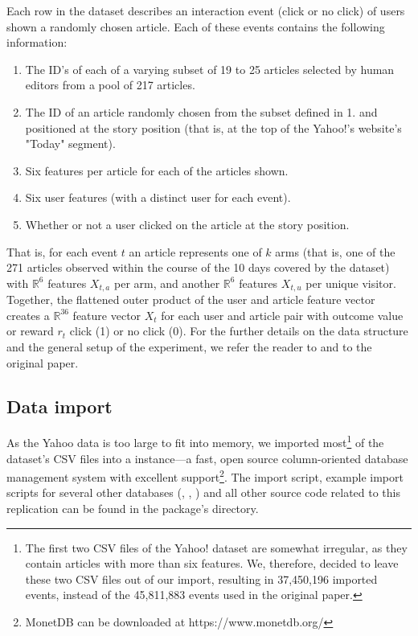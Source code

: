 \documentclass{jss}
\begin{document}
Each row in the dataset describes an interaction event (click or no click) of users shown a randomly chosen article. Each of these events contains the following information:

\begin{enumerate}
         \item The ID's of each of a varying subset of 19 to 25 articles selected by human editors from a pool of 217 articles.
         \item The ID of an article randomly chosen from the subset defined in 1. and positioned at the story position (that is, at the top of the Yahoo!'s website's "Today" segment).
         \item Six features per article for each of the articles shown.
         \item Six user features (with a distinct user for each event).
         \item Whether or not a user clicked on the article at the story position.
\end{enumerate}

That is, for each event $t$ an article represents one of $k$ arms (that is, one of the 271 articles observed within the course of the 10 days covered by the dataset) with $\mathbb{R}^6$ features $X_{t,a}$ per arm, and another $\mathbb{R}^6$ features $X_{t,u}$ per unique visitor. Together, the flattened outer product of the user and article feature vector creates a $\mathbb{R}^{36}$ feature vector $X_t$ for each user and article pair with outcome value or reward $r_t$ click (1) or no click (0). For the further details on the data structure and the general setup of the experiment, we refer the reader to \cite{Chu2009} and to the original \cite{Li2010} paper.

\subsection{Data import} \label{dataimp}

As the Yahoo data is too large to fit into memory, we imported most\footnote{The first two CSV files of the Yahoo! dataset are somewhat irregular, as they contain articles with more than six features. We, therefore, decided to leave these two CSV files out of our import, resulting in 37,450,196 imported events, instead of the 45,811,883 events used in the original paper.} of the dataset's CSV files into a  \citep{IdreosGNMMK12} instance---a fast, open source column-oriented database management system with excellent  support\footnote{MonetDB can be downloaded at https://www.monetdb.org/}. The import script, example import scripts for several other databases (, , ) and all other source code related to this replication can be found in the package's  directory.
\end{document}

